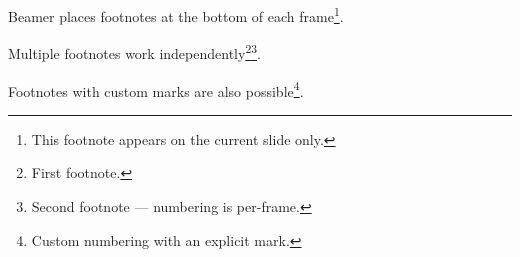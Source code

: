Beamer places footnotes at the bottom of each frame\footnote{This footnote appears on the current slide only.}.

\medskip

Multiple footnotes work independently\footnote{First footnote.}\footnote{Second footnote --- numbering is per-frame.}.

\medskip

Footnotes with custom marks are also possible\footnote[42]{Custom numbering with an explicit mark.}.
